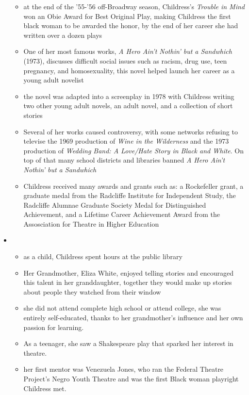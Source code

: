 \documentclass[12pt]{article}
\begin{document}
\begin{itemize}
\begin{itemize}
				\item at the end of the '55-'56 off-Broadway season, Childress's \textit{Trouble in Mind} won an Obie Award for Best Original Play, making Childress the first black woman to be awarded the honor, by the end of her career she had written over a dozen plays
				\item One of her most famous works, \textit{A Hero Ain't Nothin' but a Sandwhich} (1973), discusses difficult social issues such as racism, drug use, teen pregnancy, and homosexuality, this novel helped launch her career as a young adult novelist
				\item the novel was adapted into a screenplay in 1978 with Childress writing two other young adult novels, an adult novel, and a collection of short stories
				\item Several of her works caused controversy, with some networks refusing to televise the 1969 production of \textit{Wine in the Wilderness} and the 1973 production of \textit{Wedding Band: A Love/Hate Story in Black and White}. On top of that many school districts and libraries banned \textit{A Hero Ain't Nothin' but a Sandwhich}
				\item Childress received many awards and grants such as: a Rockefeller grant, a graduate medal from the Radcliffe Institute for Independent Study, the Radcliffe Alumnae Graduate Society Medal for Distinguished Achievement, and a Lifetime Career Achievement Award from the Assosciation for Theatre in Higher Education
            \end{itemize}
			\item {}
			\begin{itemize}
				\item as a child, Childress spent hours at the public library
				\item Her Grandmother, Eliza White, enjoyed telling stories and encouraged this talent in her granddaughter, together they would make up stories about people they watched from their window
				\item she did not attend complete high school or attend college, she was entirely self-educated, thanks to her grandmother's influence and her own passion for learning.
				\item As a teenager, she saw a Shakespeare play that sparked her interest in theatre.
				\item her first mentor was Venezuela Jones, who ran the Federal Theatre Project's Negro Youth Theatre and was the first Black woman playright Childress met.

\end{itemize}
\end{itemize}
\end{document}

